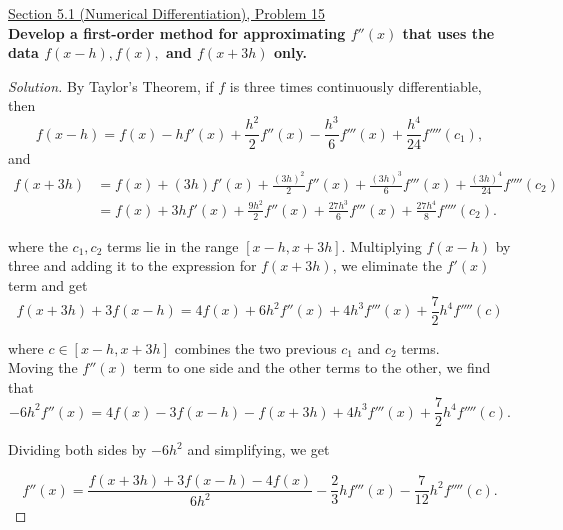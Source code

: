 \documentclass[11pt]{article}
\newenvironment{solution}
  {\renewcommand\qedsymbol{$\blacksquare$}\begin{proof}[Solution]}
  {\end{proof}}
\theoremstyle{definition}
\begin{document}
\newpage

\underline{Section 5.1 (Numerical Differentiation), Problem 15} \\

\textbf{Develop a first-order method for approximating $f''(x)$ that uses the data $f(x-h), f(x),$ and $f(x+3h)$ only.}
\begin{solution}
    By Taylor's Theorem, if $f$ is three times continuously differentiable, then
    \[ f(x-h) = f(x) - hf'(x) + \frac{h^2}{2} f''(x) - \frac{h^3}{6} f'''(x) + \frac{h^4}{24}f''''(c_1),\]
    and 
    \vspace{-0.5cm}
    \begin{align*}
        f(x+3h) &= f(x) + (3h)f'(x) + \frac{(3h)^2}{2} f''(x) + \frac{(3h)^3}{6} f'''(x) + \frac{(3h)^4}{24} f''''(c_2) \\
        &= f(x) + 3hf'(x) + \frac{9h^2}{2} f''(x) + \frac{27h^3}{6} f'''(x) + \frac{27h^4}{8} f''''(c_2).
    \end{align*}

where the $c_1, c_2$ terms lie in the range $[x-h, x+3h].$ 
Multiplying $f(x-h)$ by three and adding it to the expression for $f(x+3h)$, we eliminate the $f'(x)$ term and get
\[ f(x+3h) + 3f(x-h) = 4f(x) + 6h^2f''(x) + 4h^3f'''(x) + \frac{7}{2} h^4 f''''(c)\]

where $c \in [x-h, x+3h]$ combines the two previous $c_1$ and $c_2$ terms. \\

Moving the $f''(x)$ term to one side and the other terms to the other, we find that
\[ -6h^2f''(x) = 4f(x) - 3f(x-h) - f(x+3h) + 4h^3f'''(x) + \frac{7}{2}h^4 f''''(c).\]

Dividing both sides by $-6h^2$ and simplifying, we get

\[ \boxed{f''(x) = \frac{f(x+3h) + 3f(x-h) - 4f(x)}{6h^2} - \frac{2}{3}h f'''(x) - \frac{7}{12}h^2 f''''(c)}. \]
\end{solution}
\end{document}
